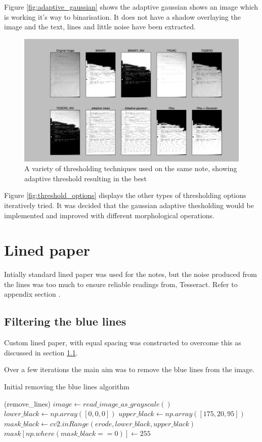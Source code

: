 Figure \ref{fig:adaptive_gaussian} shows the adaptive gaussian shows an image which is working it's way to binarisation. It does not have a shadow overlaying the image and the text, lines and little noise have been extracted.

\begin{figure}[H]
  \centering
  \includegraphics[scale=0.3]{images/thresholding_options}
  \caption{A variety of thresholding techniques used on the same note, showing adaptive threshold resulting in the best}
  \label{fig:thresholding_options}
\end{figure}

Figure \ref{fig:threshold_options} displays the other types of thresholding options iteratively tried. It was decided that the gaussian adaptive thesholding would be implemented and improved with different morphological operations.

\section{Lined paper}
Intially standard lined paper was used for the notes, but the noise produced from the lines was too much to ensure reliable readings from, Tesseract. Refer to appendix \cite{appendix:image_processing} section \cite{processing:pre-line}.

\subsection{Filtering the blue lines}
Custom lined paper, with equal spacing was constructed to overcome this as discussed in section \ref{}.

Over a few iterations the main aim was to remove the blue lines from the image.
\begin{algorithm}
\caption{Initial removing the blue lines algorithm}
\label{algorithm:threshold1}
\begin{algorithmic}[1]
  \Function(remove\_lines)
    \State $image \gets read\_image\_as\_grayscale()$
    \State $lower\_black \gets np.array([0,0,0])$
    \State $upper\_black \gets np.array([175,20, 95])$
    \State $mask\_black \gets cv2.inRange(erode, lower\_black, upper\_black)$
    \State $mask[np.where(mask\_black == 0)] \gets 255$
  \EndFunction
  \end{algorithmic}
\end{algorithm}

